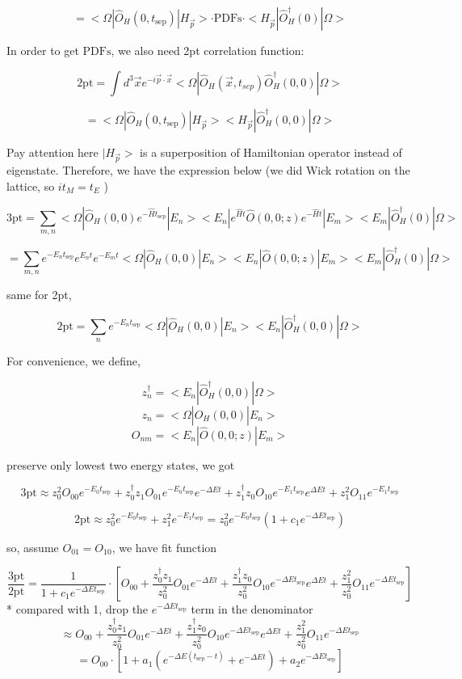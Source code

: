 \documentclass[prd,aps,nofootinbib,floatfix,10pt]{revtex4}
\begin{document}
\[ = <\Omega |\hat{O}_{H} (0, t_{\text{sep}})  |H_{\vec{p}}> \cdot \text{PDFs} \cdot <H_{\vec{p}}| \hat{O}_{H}^{\dagger}(0) | \Omega> \]

In order to get $\text{PDFs}$, we also need 2pt correlation function:

\[ \text{2pt} = \int d^{3} \vec{x} e^{-i \vec{p} \cdot \vec{x}} <\Omega |\hat{O}_{H}\left(\vec{x}, t_{s e p}\right) \hat{O}_{H}^{\dagger}(0,0) | \Omega> \]

\[ = <\Omega |\hat{O}_{H} (0, t_{\text{sep}})  |H_{\vec{p}}>  <H_{\vec{p}}| \hat{O}_{H}^{\dagger}(0, 0) | \Omega> \]

{\color{red} Pay attention here $|H_{\vec{p}}>$ is a superposition of Hamiltonian operator instead of eigenstate. Therefore, we have the expression below (we did Wick rotation on the lattice, so $it_{M} = t_{E}$ ) }

\[ \text{3pt} = \sum_{m, n} <\Omega |\hat{O}_{H} (0, 0) e^{- \hat{H} t_{\text{sep}}}  |E_n><E_n| e^{\hat{H} t } \hat{O}(0, 0; z) e^{- \hat{H} t} |E_m><E_m| \hat{O}_{H}^{\dagger}(0) | \Omega>  \]

\[ = \sum_{m, n} e^{- E_n t_{\text{sep}}} e^{E_n t } e^{- E_m t} <\Omega |\hat{O}_{H} (0, 0)  |E_n><E_n|  \hat{O}(0, 0; z) |E_m><E_m| \hat{O}_{H}^{\dagger}(0) | \Omega> \]


same for 2pt,

\[ \text{2pt} =  \sum_{n} e^{- E_n t_{\text{sep}}} <\Omega |\hat{O}_{H} (0, 0)  |E_n>  <E_n| \hat{O}_{H}^{\dagger}(0, 0) | \Omega>  \]

For convenience, we define,

\[ z_n^{\dagger} = <E_n| \hat{O}_{H}^{\dagger}(0, 0) | \Omega> \]
\[ z_n = <\Omega |\hat{O}_{H} (0, 0)  |E_n> \]
\[ O_{n m} = <E_n|  \hat{O}(0, 0; z) |E_m> \]


preserve only lowest two energy states, we got

\[ \text{3pt} \approx z_0^2 O_{00} e^{-E_0 t_{\text{sep}}} + z_0^{\dagger} z_1 O_{01} e^{-E_0 t_{\text{sep}}} e^{- \Delta E t} + z_1^{\dagger} z_0 O_{10} e^{-E_1 t_{\text{sep}}} e^{\Delta E t} + z_1^2 O_{11} e^{- E_1 t_{\text{sep}}} \]

\[ \text{2pt} \approx z_0^2 e^{-E_0 t_{\text{sep}}} + z_1^2 e^{-E_1 t_{\text{sep}}} = z_0^2 e^{-E_0 t_{\text{sep}}} (1 + c_1 e^{-\Delta E t_{\text{sep}}}) \]

so, assume $O_{01} = O_{10}$, we have fit function

\[ \frac{\text{3pt}}{\text{2pt}} = \frac{1}{1 + c_1 e^{-\Delta E t_{\text{sep}}}} \cdot [ O_{00} + \frac{z_0^{\dagger} z_1}{z_0^2} O_{0 1} e^{-\Delta E t} + \frac{ z_1^{\dagger} z_0}{z_0^2} O_{10} e^{-\Delta E t_{\text{sep}}} e^{\Delta E t} + \frac{z_1^2}{z_0^2} O_{1 1} e^{- \Delta E t_{\text{sep}}} ] \]
{\color{red} * compared with 1, drop the $e^{- \Delta E t_{\text{sep}}}$ term in the denominator}
\[ \approx O_{00} + \frac{z_0^{\dagger} z_1}{z_0^2} O_{0 1} e^{-\Delta E t} + \frac{ z_1^{\dagger} z_0}{z_0^2} O_{10} e^{-\Delta E t_{\text{sep}}} e^{\Delta E t} + \frac{z_1^2}{z_0^2} O_{1 1} e^{- \Delta E t_{\text{sep}}} \]
\[ = O_{00} \cdot [1 + a_1 (e^{- \Delta E (t_{\text{sep}} - t)} + e^{- \Delta E t}) + a_2 e^{- \Delta E t_{\text{sep}}}]  \]
\end{document}
